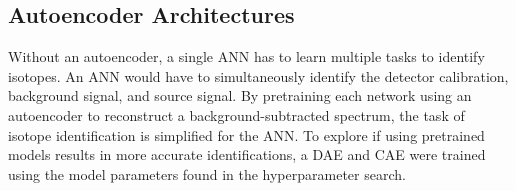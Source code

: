 
\subsection{Autoencoder Architectures} \label{section_autoencoder_archetectures}

Without an autoencoder, a single ANN has to learn multiple tasks to identify isotopes. An ANN would have to simultaneously identify the detector calibration, background signal, and source signal. By pretraining each network using an autoencoder to reconstruct a background-subtracted spectrum, the task of isotope identification is simplified for the ANN. To explore if using pretrained models results in more accurate identifications, a DAE and CAE were trained using the model parameters found in the hyperparameter search.

